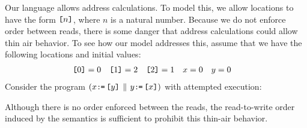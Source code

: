 

Our language allows address calculations.  To model this, we allow locations
to have the form $\texttt{[}n\texttt{]}$, where $n$ is a natural number.  Because we do not
enforce order between reads, there is some danger that address calculations
could allow thin air behavior.   To see how our model addresses this, assume
that we have the following locations and initial values:
\begin{align*}
  \texttt{[}0\texttt{]}&=0  &
  \texttt{[}1\texttt{]}&=2  &
  \texttt{[}2\texttt{]}&=1  &
  x &=0 &
  y &=0 
\end{align*}
Consider the program
\begin{math}
  (x\texttt{:}\mkern-1mu\texttt{=}\,\texttt{[}y\texttt{]} \,\mathbin{\|}\, y\texttt{:}\mkern-1mu\texttt{=}\,\texttt{[}x\texttt{]})
\end{math}
with attempted execution:
\begin{tikzdisplay}[node distance=1em]
\end{tikzdisplay}
Although there is no order enforced between the reads, the read-to-write
order induced by the semantics is sufficient to prohibit this thin-air
behavior.

